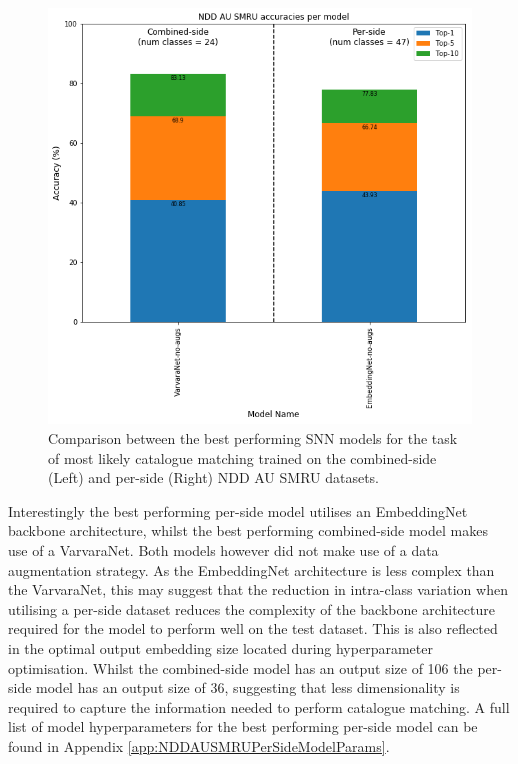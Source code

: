 \begin{figure}[t]
	\begin{center}
		\includegraphics[scale=0.4]{Chapter5/figs/NDDAUSMRU-combined-and-per-side-comparison.png}
	\end{center}
	\caption{Comparison between the best performing SNN models for the task of most likely catalogue matching trained on the combined-side (Left) and per-side (Right) NDD AU SMRU datasets.}
	\label{fig:NDDAUSMRU-combined-and-per-side-comparison}
\end{figure}

Interestingly the best performing per-side model utilises an EmbeddingNet backbone architecture, whilst the best performing combined-side model makes use of a VarvaraNet. Both models however did not make use of a data augmentation strategy. As the EmbeddingNet architecture is less complex than the VarvaraNet, this may suggest that the reduction in intra-class variation when utilising a per-side dataset reduces the complexity of the backbone architecture required for the model to perform well on the test dataset. This is also reflected in the optimal output embedding size located during hyperparameter optimisation. Whilst the combined-side model has an output size of 106 the per-side model has an output size of 36, suggesting that less dimensionality is required to capture the information needed to perform catalogue matching. A full list of model hyperparameters for the best performing per-side model can be found in Appendix \ref{app:NDDAUSMRUPerSideModelParams}.

